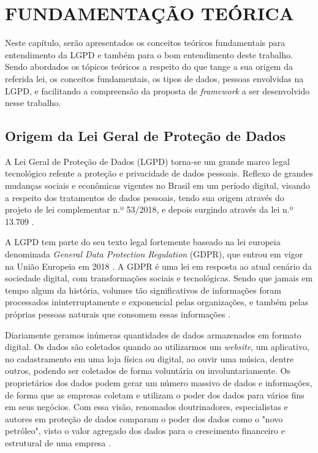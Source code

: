 \documentclass[
	12pt,				%
	openright,			%
	oneside,			%
	a4paper,			%
	english,			%
	french,				%
	spanish,			%
	brazil,				%
	]{abntex2}
\begin{document}
\chapter{FUNDAMENTAÇÃO TEÓRICA}
\label{ch: fundamentacao teorica}


Neste capítulo, serão apresentados os conceitos teóricos fundamentais para entendimento da LGPD e também para o bom entendimento deste trabalho. Sendo abordados os tópicos teóricos a respeito do que tange a sua origem da referida lei, os conceitos fundamentais, os tipos de dados, pessoas envolvidas na LGPD, e facilitando a compreensão da proposta de \textit{framework} a ser desenvolvido nesse trabalho.

\section{Origem da Lei Geral de Proteção de Dados }
\label{sec: exemplo}

A Lei Geral de Proteção de Dados (LGPD) torna-se um grande marco legal tecnológico refente a proteção e privacidade de dados pessoais. Reflexo de grandes mudanças sociais e econômicas vigentes no Brasil em um período digital, visando a respeito dos tratamentos de dados pessoais, tendo sua origem através do projeto de lei complementar n.º 53/2018, e depois surgindo através da lei n.º 13.709 \cite{01-01-LeiGeral}. 

A LGPD tem parte do seu texto legal fortemente baseado na lei europeia denominada \textit{General Data Protection Regulation} (GDPR), que entrou em vigor na União Europeia em 2018 \cite{02-01-Redecker2021}. A GDPR é uma lei em resposta ao atual cenário da sociedade digital, com transformações sociais e tecnológicas. Sendo que jamais em tempo algum da história, volumes tão significativos de informações foram processados ininterruptamente e exponencial pelas organizações, e também pelas próprias pessoas naturais que consomem essas informações \cite{02-01-Vainzof2020}.

Diariamente geramos inúmeras quantidades de dados armazenados em formato digital. Os dados são coletados quando ao utilizarmos um \textit{website}, um aplicativo, no cadastramento em uma loja física ou digital, ao ouvir uma música, dentre outros, podendo ser coletados de forma voluntária ou involuntariamente. Os proprietários dos dados podem gerar um número massivo de dados e informações, de forma que as empresas coletam e utilizam o poder dos dados para vários fins em seus negócios. Com essa visão, renomados doutrinadores, especialistas e autores em proteção de dados comparam o poder dos dados como o "novo petróleo", visto o valor agregado dos dados para o crescimento financeiro e estrutural de uma empresa \cite{02-01-Jobim2021}. 
\end{document}
